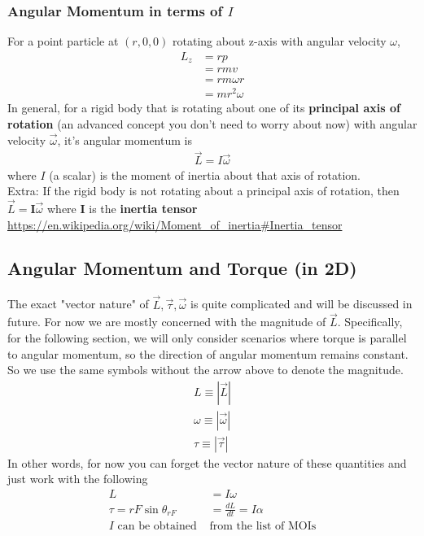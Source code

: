 \documentclass{article}
\begin{document}
\subsubsection{Angular Momentum in terms of $I$}
For a point particle at $(r,0,0)$ rotating about z-axis with angular velocity $\omega$, 
\begin{align}
    L_z &= r p \\
    &= r mv \\
    &= r m \omega r \\ 
    &= mr^2 \omega
\end{align}
In general, for a rigid body that is rotating about one of its \textbf{principal axis of rotation} (an advanced concept you don't need to worry about now) with angular velocity $\vec{\omega}$, it's angular momentum is
\begin{align}
    \vec{L} = I \vec{\omega}
\end{align}
where $I$ (a scalar) is the moment of inertia about that axis of rotation. \\[10pt]
Extra: If the rigid body is not rotating about a principal axis of rotation, then $\vec{L} = \mathbf{I} \vec{\omega}$ where $\mathbf{I}$ is the \textbf{inertia tensor} \url{https://en.wikipedia.org/wiki/Moment_of_inertia#Inertia_tensor}
\newpage
\subsection{Angular Momentum and Torque (in 2D)}
\label{sec:torque}
The exact "vector nature" of $\vec{L},\vec{\tau},\vec{\omega}$ is quite complicated and will be discussed in future. For now we are mostly concerned with the magnitude of $\vec{L}$. Specifically, for the following section, we will only consider scenarios where torque is parallel to angular momentum, so the direction of angular momentum remains constant. So we use the same symbols without the arrow above to denote the magnitude.
\begin{align}
    L \equiv |\vec{L}| \\
    \omega \equiv |\vec{\omega}| \\
    {\tau} \equiv |\vec{\tau}|
\end{align}
In other words, for now you can forget the vector nature of these quantities and just work with the following 
\begin{align}
    L &= I\omega \\
    \tau = rF \sin \theta_{rF} &= \frac{dL}{dt} = I\alpha \\
    I \text{ can be obtained } & \text{from the list of MOIs}
\end{align}
\end{document}

